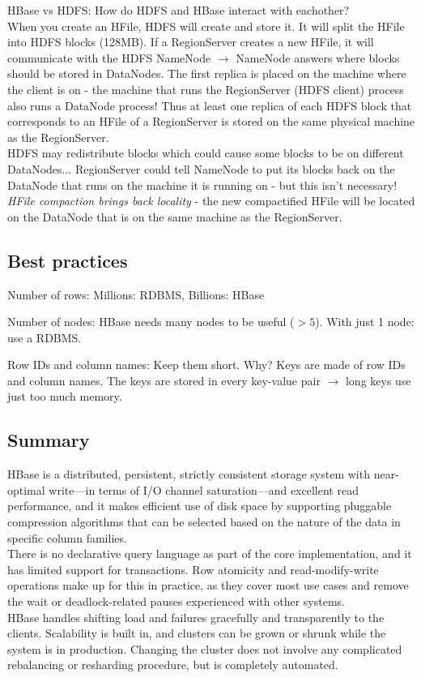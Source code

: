 \documentclass[11pt,oneside,a4paper]{article}
\begin{document}
HBase vs HDFS: How do HDFS and HBase interact with eachother?\\
When you create an HFile, HDFS will create and store it. It will split the HFile into HDFS blocks (128MB). If a RegionServer creates a new HFile, it will communicate with the HDFS NameNode $\rightarrow$ NameNode answers where blocks should be stored in DataNodes. The first replica is placed on the machine where the client is on - the machine that runs the RegionServer (HDFS client) process also runs a DataNode process! Thus at least one replica of each HDFS block that corresponds to an HFile of a RegionServer is stored on the same physical machine as the RegionServer.\\

HDFS may redistribute blocks which could cause some blocks to be on different DataNodes... RegionServer could tell NameNode to put its blocks back on the DataNode that runs on the machine it is running on - but this isn't necessary! \textit{HFile compaction brings back locality} - the new compactified HFile will be located on the DataNode that is on the same machine as the RegionServer.

\subsection{Best practices}

\begin{compactitem}
	\item Number of rows: Millions: RDBMS, Billions: HBase
	\item Number of nodes: HBase needs many nodes to be useful (\textbf{$> 5$}). With just 1 node: use a RDBMS.
	\item Row IDs and column names: Keep them short. Why? Keys are made of row IDs and column names. The keys are stored in every key-value pair $\rightarrow$ long keys use just too much memory.
\end{compactitem}

\subsection{Summary}

HBase is a distributed, persistent, strictly consistent storage system with near-optimal write—in terms of I/O channel saturation—and excellent read performance, and it makes efficient use of disk space by supporting pluggable compression algorithms that can be selected based on the nature of the data in specific column families.\\
There is no declarative query language as part of the core implementation, and it has limited support for transactions. Row atomicity and read-modify-write operations make up for this in practice, as they cover most use cases and remove the wait or deadlock-related pauses experienced with other systems.\\
HBase handles shifting load and failures gracefully and transparently to the clients. Scalability is built in, and clusters can be grown or shrunk while the system is in production. Changing the cluster does not involve any complicated rebalancing or resharding procedure, but is completely automated.
\end{document}
